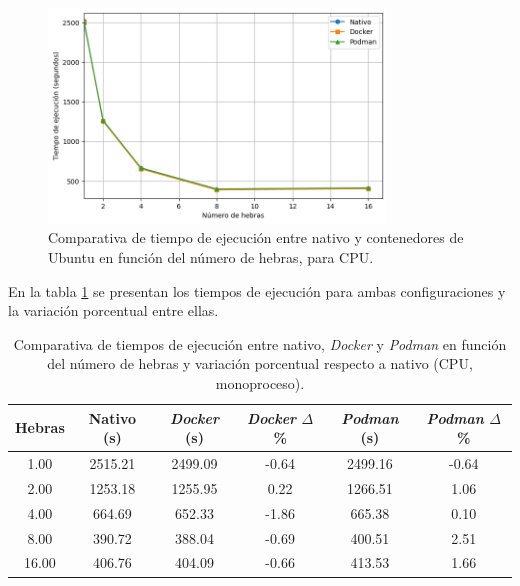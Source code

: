\begin{figure}[ht]
    \centering
    \includegraphics[width=0.8\textwidth]{imagenes/cap5/single-node_ubuntu_container_vs_native_time.png}
    \caption{Comparativa de tiempo de ejecución entre nativo y contenedores de Ubuntu en función del número de hebras, para CPU.}
    \label{fig:single-node_ubuntu_container_vs_native_time}
\end{figure}

En la tabla \ref{tab:single-node_ubuntu_container_vs_native} se presentan los tiempos de ejecución para ambas configuraciones y la variación porcentual entre ellas.

\begin{table}[ht]
    \centering
    \begin{tabular}{|c|c|c|c|c|c|}
        \hline
        \textbf{Hebras} & \textbf{Nativo (s)} & \textbf{\textit{Docker} (s)} & \textbf{\textit{Docker} $\Delta$\%} & \textbf{\textit{Podman} (s)} & \textbf{\textit{Podman} $\Delta$\%} \\
        \hline
        1.00            & 2515.21             & 2499.09                      & -0.64                               & 2499.16                      & -0.64                               \\
        2.00            & 1253.18             & 1255.95                      & 0.22                                & 1266.51                      & 1.06                                \\
        4.00            & 664.69              & 652.33                       & -1.86                               & 665.38                       & 0.10                                \\
        8.00            & 390.72              & 388.04                       & -0.69                               & 400.51                       & 2.51                                \\
        16.00           & 406.76              & 404.09                       & -0.66                               & 413.53                       & 1.66                                \\
        \hline
    \end{tabular}
    \caption{Comparativa de tiempos de ejecución entre nativo, \textit{Docker} y \textit{Podman} en función del número de hebras y variación porcentual respecto a nativo (CPU, monoproceso).}
    \label{tab:single-node_ubuntu_container_vs_native}
\end{table}

